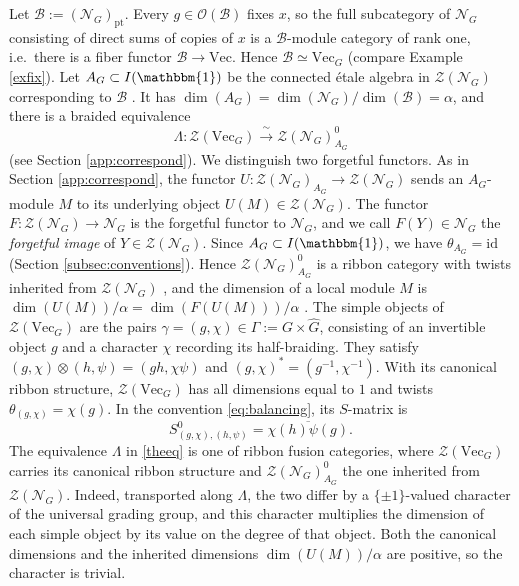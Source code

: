 \documentclass[10pt]{article}
\theoremstyle{plain}
\theoremstyle{definition}
\theoremstyle{plain}
\begin{document}
\par Let $\mathcal{B}:=(\mathcal{N}_G)_\mathrm{pt}$. Every $g\in\mathcal{O}(\mathcal{B})$ fixes $x$, so the full subcategory of $\mathcal{N}_G$ consisting of direct sums of copies of $x$ is a $\mathcal{B}$-module category of rank one, i.e.\ there is a fiber functor $\mathcal{B}\to\mathrm{Vec}$. Hence $\mathcal{B}\simeq\mathrm{Vec}_G$ (compare Example \ref{exfix}). Let $A_G\subset I(\mathbbm{1})$ be the connected \'etale algebra in $\mathcal{Z}(\mathcal{N}_{G})$ corresponding to $\mathcal{B}$ \cite[Theorem 4.10]{MR3039775}. It has $\dim(A_G)=\dim(\mathcal{N}_G)/\dim(\mathcal{B})=\alpha$, and there is a braided equivalence
\begin{equation}\label{theeq}
\Lambda\colon\mathcal{Z}(\mathrm{Vec}_G)\xrightarrow{\ \sim\ }\mathcal{Z}(\mathcal{N}_G)_{A_G}^0
\end{equation}
(see Section \ref{app:correspond}). We distinguish two forgetful functors. As in Section \ref{app:correspond}, the functor $U\colon\mathcal{Z}(\mathcal{N}_G)_{A_G}\to\mathcal{Z}(\mathcal{N}_G)$ sends an $A_G$-module $M$ to its underlying object $U(M)\in\mathcal{Z}(\mathcal{N}_G)$. The functor $F\colon\mathcal{Z}(\mathcal{N}_G)\to\mathcal{N}_G$ is the forgetful functor to $\mathcal{N}_G$, and we call $F(Y)\in\mathcal{N}_G$ the \emph{forgetful image} of $Y\in\mathcal{Z}(\mathcal{N}_G)$. Since $A_G\subset I(\mathbbm{1})$, we have $\theta_{A_G}=\mathrm{id}$ (Section \ref{subsec:conventions}). Hence $\mathcal{Z}(\mathcal{N}_G)^0_{A_G}$ is a ribbon category with twists inherited from $\mathcal{Z}(\mathcal{N}_G)$ \cite[Theorem 1.17]{MR1936496}, and the dimension of a local module $M$ is $\dim(U(M))/\alpha=\dim(F(U(M)))/\alpha$ \cite[Theorem 1.18]{MR1936496}. The simple objects of $\mathcal{Z}(\mathrm{Vec}_G)$ are the pairs $\gamma=(g,\chi)\in\Gamma:=G\times\widehat{G}$, consisting of an invertible object $g$ and a character $\chi$ recording its half-braiding. They satisfy $(g,\chi)\otimes(h,\psi)=(gh,\chi\psi)$ and $(g,\chi)^\ast=(g^{-1},\chi^{-1})$. With its canonical ribbon structure, $\mathcal{Z}(\mathrm{Vec}_G)$ has all dimensions equal to $1$ and twists $\theta_{(g,\chi)}=\chi(g)$. In the convention \eqref{eq:balancing}, its $S$-matrix is
\begin{equation}\label{eq:S0}
S^0_{(g,\chi),(h,\psi)}=\overline{\chi(h)\psi(g)}.
\end{equation}
The equivalence $\Lambda$ in \eqref{theeq} is one of ribbon fusion categories, where $\mathcal{Z}(\mathrm{Vec}_G)$ carries its canonical ribbon structure and $\mathcal{Z}(\mathcal{N}_G)^0_{A_G}$ the one inherited from $\mathcal{Z}(\mathcal{N}_G)$. Indeed, transported along $\Lambda$, the two differ by a $\{\pm1\}$-valued character of the universal grading group, and this character multiplies the dimension of each simple object by its value on the degree of that object. Both the canonical dimensions and the inherited dimensions $\dim(U(M))/\alpha$ are positive, so the character is trivial.
\end{document}
